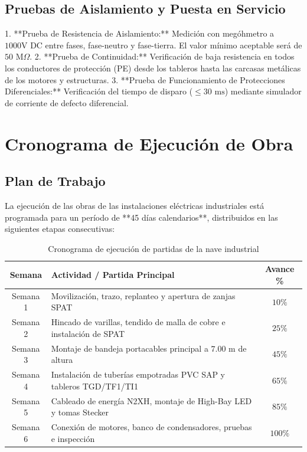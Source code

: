 \section{Pruebas de Aislamiento y Puesta en Servicio}
1. **Prueba de Resistencia de Aislamiento:** Medición con megóhmetro a $1000\text{V DC}$ entre fases, fase-neutro y fase-tierra. El valor mínimo aceptable será de $50\text{ M}\Omega$.
2. **Prueba de Continuidad:** Verificación de baja resistencia en todos los conductores de protección (PE) desde los tableros hasta las carcasas metálicas de los motores y estructuras.
3. **Prueba de Funcionamiento de Protecciones Diferenciales:** Verificación del tiempo de disparo ($\le 30\text{ ms}$) mediante simulador de corriente de defecto diferencial.

\chapter{Cronograma de Ejecución de Obra}

\section{Plan de Trabajo}
La ejecución de las obras de las instalaciones eléctricas industriales está programada para un período de **45 días calendarios**, distribuidos en las siguientes etapas consecutivas:

\begin{table}[H]
\centering
\caption{Cronograma de ejecución de partidas de la nave industrial}
\begin{tabular}{clc}
\toprule
\textbf{Semana} & \textbf{Actividad / Partida Principal} & \textbf{Avance \%} \\
\midrule
Semana 1 & Movilización, trazo, replanteo y apertura de zanjas SPAT & $10\%$ \\
Semana 2 & Hincado de varillas, tendido de malla de cobre e instalación de SPAT & $25\%$ \\
Semana 3 & Montaje de bandeja portacables principal a $7.00\text{ m}$ de altura & $45\%$ \\
Semana 4 & Instalación de tuberías empotradas PVC SAP y tableros TGD/TF1/TI1 & $65\%$ \\
Semana 5 & Cableado de energía N2XH, montaje de High-Bay LED y tomas Stecker & $85\%$ \\
Semana 6 & Conexión de motores, banco de condensadores, pruebas e inspección & $100\%$ \\
\bottomrule
\end{tabular}
\end{table}
